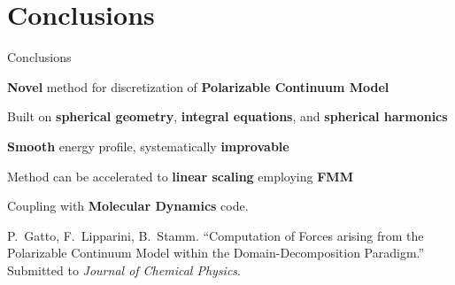 \section{{\bf Conclusions}}


\begin{frame}{Conclusions}

\begin{wideitemize}
\item {\bf Novel} method for discretization of {\bf Polarizable Continuum Model}
\item Built on {\bf spherical geometry}, {\bf integral equations}, and {\bf spherical harmonics}
\item {\bf Smooth} energy profile, systematically {\bf improvable}
\pause
\item Method can be accelerated to {\bf linear scaling} employing {\bf FMM}
\item Coupling with {\bf Molecular Dynamics} code.
\end{wideitemize}


\vfill

{\footnotesize
{P.~Gatto}, F.~Lipparini, B.~Stamm. ``Computation of Forces arising from the Polarizable Continuum Model within the Domain-Decomposition Paradigm.'' Submitted to \textit{Journal of Chemical Physics}.
}
\end{frame}

%
%
%
%
%
%


